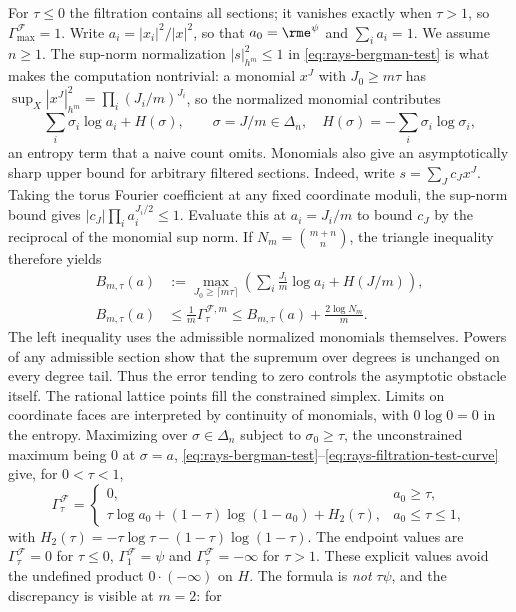 \begin{example}
For $\tau\leq0$ the filtration contains all sections; it vanishes
exactly when $\tau>1$, so
$\Gamma^{\mathcal F}_{\max}=1$.  Write $a_i=|x_i|^2/|x|^2$, so that
$a_0=\rme^{\psi}$ and $\sum_ia_i=1$.  We assume $n\geq1$.
The sup-norm normalization
$|s|^2_{h^m}\leq1$ in \eqref{eq:rays-bergman-test} is what makes the
computation nontrivial: a monomial $x^J$ with $J_0\geq m\tau$ has
$\sup_X|x^J|^2_{h^m}=\prod_i(J_i/m)^{J_i}$, so the normalized monomial
contributes
\[
 \sum_i\sigma_i\log a_i+H(\sigma),
 \qquad\sigma=J/m\in\Delta_n,\quad
 H(\sigma)=-\sum_i\sigma_i\log\sigma_i ,
\]
an entropy term that a naive count omits.  Monomials also give an
asymptotically sharp upper bound for arbitrary filtered sections.
Indeed, write $s=\sum_Jc_Jx^J$.  Taking the torus Fourier coefficient
at any fixed coordinate moduli, the sup-norm bound gives
$|c_J|\prod_i a_i^{J_i/2}\leq1$.  Evaluate this at $a_i=J_i/m$
to bound $c_J$ by the reciprocal of the monomial sup norm.
If $N_m=\binom{m+n}{n}$, the triangle inequality therefore yields
\[
 \begin{split}
 B_{m,\tau}(a)&:=\max_{J_0\geq\lceil m\tau\rceil}
    \left(\sum_i\frac{J_i}{m}\log a_i+H(J/m)\right),\\
 B_{m,\tau}(a)&\leq\frac1m\Gamma_\tau^{\mathcal F,m}
 \leq B_{m,\tau}(a)+\frac{2\log N_m}{m}.
 \end{split}
\]
The left inequality uses the admissible normalized monomials themselves.
Powers of any admissible section show that the supremum over degrees
is unchanged on every degree tail.  Thus the error tending to zero
controls the asymptotic obstacle itself.  The rational lattice points fill
the constrained simplex.  Limits on coordinate faces are interpreted by
continuity of monomials, with $0\log0=0$ in the entropy.
Maximizing over
$\sigma\in\Delta_n$ subject to $\sigma_0\geq\tau$, the unconstrained
maximum being $0$ at $\sigma=a$,
\eqref{eq:rays-bergman-test}--\eqref{eq:rays-filtration-test-curve} give,
for $0<\tau<1$,
\[
 \Gamma_\tau^{\mathcal F}
 =\begin{cases}
   0, & a_0\geq\tau,\\[2pt]
   \tau\log a_0+(1-\tau)\log(1-a_0)+H_2(\tau),
     & a_0\leq\tau\leq1,
  \end{cases}
\]
with $H_2(\tau)=-\tau\log\tau-(1-\tau)\log(1-\tau)$.
The endpoint values are $\Gamma_\tau^{\mathcal F}=0$ for $\tau\leq0$,
$\Gamma_1^{\mathcal F}=\psi$ and
$\Gamma_\tau^{\mathcal F}=-\infty$ for $\tau>1$.
These explicit values avoid the undefined product $0\cdot(-\infty)$ on $H$.
The formula is
\emph{not} $\tau\psi$, and the discrepancy is visible at $m=2$: for

\end{example}
